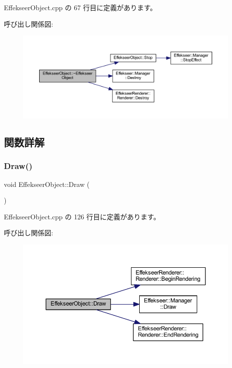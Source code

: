  Effekseer\+Object.\+cpp の 67 行目に定義があります。

呼び出し関係図\+:\nopagebreak
\begin{figure}[H]
\begin{center}
\leavevmode
\includegraphics[width=350pt]{class_effekseer_object_a0463ba508e3c83576991138465847054_cgraph}
\end{center}
\end{figure}


\subsection{関数詳解}
\mbox{\label{class_effekseer_object_adc628e5089ca0cdc418e92729943a3b2}} 
\subsubsection{\texorpdfstring{Draw()}{Draw()}}
{\footnotesize\ttfamily void Effekseer\+Object\+::\+Draw (\begin{DoxyParamCaption}{ }\end{DoxyParamCaption})}



 Effekseer\+Object.\+cpp の 126 行目に定義があります。

呼び出し関係図\+:\nopagebreak
\begin{figure}[H]
\begin{center}
\leavevmode
\includegraphics[width=350pt]{class_effekseer_object_adc628e5089ca0cdc418e92729943a3b2_cgraph}
\end{center}
\end{figure}
\mbox{\label{class_effekseer_object_a482a0e824d8719b7676ae15948ae7348}} 
